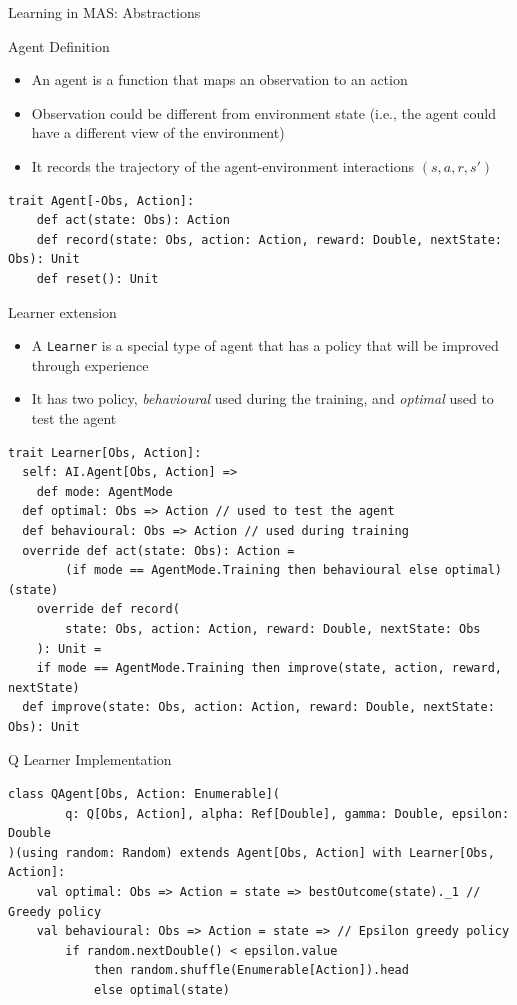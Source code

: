 \documentclass[presentation, 8pt]{beamer}\mode<presentation>{\usetheme{AMSBolognaFC}}
\begin{document}
\begin{frame}{Learning in MAS: Abstractions}
\begin{exampleblock}{Agent Definition}
	\begin{itemize}
		\item An agent is a function that maps an observation to an action
		\item Observation could be different from environment state (i.e., the agent could have a different view of the environment)
		\item It records the trajectory of the agent-environment interactions $(s, a, r, s')$ 
	\end{itemize}
\begin{lstlisting}[style=scala]
trait Agent[-Obs, Action]:
	def act(state: Obs): Action
	def record(state: Obs, action: Action, reward: Double, nextState: Obs): Unit 
	def reset(): Unit
\end{lstlisting}
\end{exampleblock}
\begin{exampleblock}{Learner extension}
\begin{itemize}
	\item A \lstinline[style=scala]{Learner} is a special type of agent that has a policy that will be improved through experience
	\item It has two policy, \emph{behavioural} used during the training, and \emph{optimal} used to test the agent
\end{itemize}
\begin{lstlisting}[style=scala]
trait Learner[Obs, Action]:
  self: AI.Agent[Obs, Action] =>
	def mode: AgentMode
  def optimal: Obs => Action // used to test the agent
  def behavioural: Obs => Action // used during training
  override def act(state: Obs): Action = 
		(if mode == AgentMode.Training then behavioural else optimal) (state)
	override def record(
		state: Obs, action: Action, reward: Double, nextState: Obs
	): Unit =
    if mode == AgentMode.Training then improve(state, action, reward, nextState)
  def improve(state: Obs, action: Action, reward: Double, nextState: Obs): Unit
\end{lstlisting}
\end{exampleblock}
\framebreak
\begin{exampleblock}{Q Learner Implementation}
	\begin{lstlisting}[style=scala]
class QAgent[Obs, Action: Enumerable](
		q: Q[Obs, Action], alpha: Ref[Double], gamma: Double, epsilon: Double
)(using random: Random) extends Agent[Obs, Action] with Learner[Obs, Action]:
	val optimal: Obs => Action = state => bestOutcome(state)._1 // Greedy policy
	val behavioural: Obs => Action = state => // Epsilon greedy policy
		if random.nextDouble() < epsilon.value 
			then random.shuffle(Enumerable[Action]).head
			else optimal(state)


\end{lstlisting}
\end{exampleblock}
\end{frame}
\end{document}
